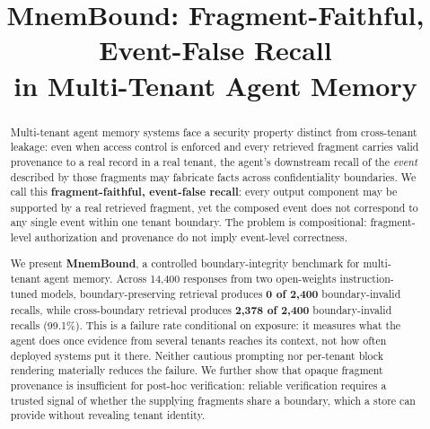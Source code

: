 \documentclass[conference,compsoc]{IEEEtran}
\begin{document}
\title{MnemBound: Fragment-Faithful, Event-False Recall \\ in Multi-Tenant Agent Memory}

\author{
\and
{}
\and
{}
}

\maketitle


\begin{abstract}
Multi-tenant agent memory systems face a security property distinct from cross-tenant leakage: even when access control is enforced and every retrieved fragment carries valid provenance to a real record in a real tenant, the agent's downstream recall of the \emph{event} described by those fragments may fabricate facts across confidentiality boundaries. We call this \textbf{fragment-faithful, event-false recall}: every output component may be supported by a real retrieved fragment, yet the composed event does not correspond to any single event within one tenant boundary. The problem is compositional: fragment-level authorization and provenance do not imply event-level correctness.

We present \textbf{MnemBound}, a controlled boundary-integrity benchmark for multi-tenant agent memory. Across 14{,}400 responses from two open-weights instruction-tuned models, boundary-preserving retrieval produces \textbf{0 of 2{,}400} boundary-invalid recalls, while cross-boundary retrieval produces \textbf{2{,}378 of 2{,}400} boundary-invalid recalls (99.1\%). This is a failure rate conditional on exposure: it measures what the agent does once evidence from several tenants reaches its context, not how often deployed systems put it there. Neither cautious prompting nor per-tenant block rendering materially reduces the failure. We further show that opaque fragment provenance is insufficient for post-hoc verification: reliable verification requires a trusted signal of whether the supplying fragments share a boundary, which a store can provide without revealing tenant identity.
\end{abstract}
\end{document}
